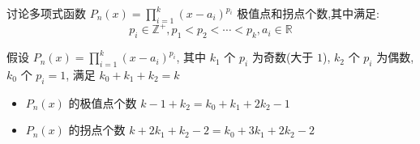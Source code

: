 \begin{proposition}\label{pro: 命题三}
	讨论多项式函数 $P_{n}(x) = \prod\limits_{i = 1}^{k}(x-a_{i})^{p_{i}}$ 极值点和拐点个数,其中满足:
	$$p_{i}\in\mathbb{Z}^{+}, p_{1} < p_{2} < \cdots < p_{k}, a_{i}\in \mathbb{R}$$
\end{proposition}
\begin{corollary}[极值点和拐点个数]
	假设 $P_{n}(x) = \prod\limits_{i = 1}^{k}(x-a_{i})^{p_{i}}$, 其中 $k_{1}$ 个 $p_{i}$ 为奇数(大于 $1$), $k_{2}$ 个 $p_{i}$ 为偶数, $k_{0}$ 个 $p_{i}=1$, 满足 $k_{0}+k_{1}+k_{2} = k$
	\begin{itemize}
		\item $P_{n}(x)$ 的极值点个数 $k-1+k_{2} = k_{0}+k_{1}+2k_{2}-1$
		\item $P_{n}(x)$ 的拐点个数 $k+2k_{1}+k_{2}-2 = k_{0}+3k_{1}+2k_{2}-2$
	\end{itemize}
\end{corollary}
